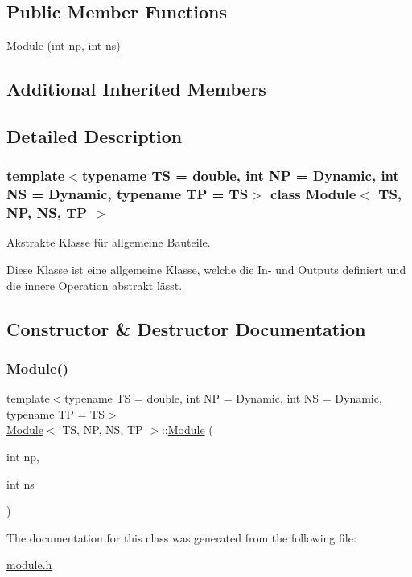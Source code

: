 \subsection*{Public Member Functions}
\begin{DoxyCompactItemize}
\item 
\mbox{\hyperlink{class_module_a3cbc8718d92a4420abb1676ae7cc4d8a}{Module}} (int \mbox{\hyperlink{class_n_o_n_l_i_n_e_a_r___s_y_s_t_e_m_ab5876470030832088d8ee1ed609d5311}{np}}, int \mbox{\hyperlink{class_n_o_n_l_i_n_e_a_r___s_y_s_t_e_m_abf4102c649f8316e44033a76f9d6183f}{ns}})
\end{DoxyCompactItemize}
\subsection*{Additional Inherited Members}


\subsection{Detailed Description}
\subsubsection*{template$<$typename TS = double, int NP = Dynamic, int NS = Dynamic, typename TP = TS$>$\newline
class Module$<$ T\+S, N\+P, N\+S, T\+P $>$}

Akstrakte Klasse für allgemeine Bauteile. 

Diese Klasse ist eine allgemeine Klasse, welche die In-\/ und Outputs definiert und die innere Operation abstrakt lässt. 

\subsection{Constructor \& Destructor Documentation}
\mbox{\label{class_module_a3cbc8718d92a4420abb1676ae7cc4d8a}} 
\subsubsection{\texorpdfstring{Module()}{Module()}}
{\footnotesize\ttfamily template$<$typename TS = double, int NP = Dynamic, int NS = Dynamic, typename TP = TS$>$ \\
\mbox{\hyperlink{class_module}{Module}}$<$ TS, NP, NS, TP $>$\+::\mbox{\hyperlink{class_module}{Module}} (\begin{DoxyParamCaption}\item[{int}]{np,  }\item[{int}]{ns }\end{DoxyParamCaption})\hspace{0.3cm}{\ttfamily [inline]}}



The documentation for this class was generated from the following file\+:\begin{DoxyCompactItemize}
\item 
\mbox{\hyperlink{module_8h}{module.\+h}}\end{DoxyCompactItemize}
